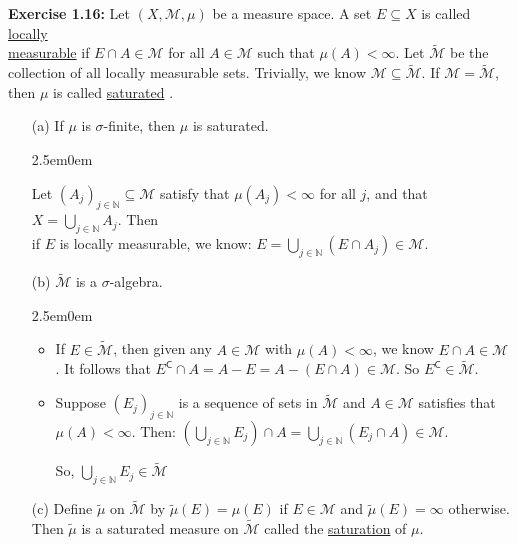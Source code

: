 \documentclass{book}
\newcommand{\exTwoP}{%
   \color{RedViolet}%
   \fontsize{13}{15}\selectfont%
}
\newenvironment{myIndent}{%
   \begin{adjustwidth}{2.5em}{0em}%
}{%
   \end{adjustwidth}%
}
\newcommand{\udefine}[1]{{%
   \setulcolor{Red}%
   \setul{0.14em}{0.07em}%
   \ul{#1}%
}}
\newcommand{\blab}[1]{\textbf{#1}}
\newcommand{\comp}{\mathsf{C}}
\newcommand{\retTwo}{\hfill\bigbreak}
\begin{document}
\blab{Exercise 1.16:} Let $(X, \mathcal{M}, \mu)$ be a measure space. A set $E \subseteq X$ is called \udefine{locally\\ measurable} if $E \cap A \in \mathcal{M}$ for all $A \in \mathcal{M}$ such that $\mu(A) < \infty$. Let $\widetilde{\mathcal{M}}$ be the\\ collection of all locally measurable sets. Trivially, we know $\mathcal{M} \subseteq \widetilde{\mathcal{M}}$. If $\mathcal{M} = \widetilde{\mathcal{M}}$,\\ then $\mu$ is called \udefine{saturated}.

\begin{enumerate}
   \item[(a)] If $\mu$ is $\sigma$-finite, then $\mu$ is saturated.
   
   \begin{myIndent}\exTwoP
      Let $(A_j)_{j \in \mathbb{N}} \subseteq \mathcal{M}$ satisfy that $\mu(A_j) < \infty$ for all $j$, and that $X = \bigcup\limits_{j\in\mathbb{N}}A_j$. Then\\ [-8pt] if $E$ is locally measurable, we know: $E = \bigcup\limits_{j \in \mathbb{N}}(E \cap A_j) \in \mathcal{M}$. 
   \end{myIndent}

   \item[(b)] $\widetilde{\mathcal{M}}$ is a $\sigma$-algebra.
   \begin{myIndent}\exTwoP
      \begin{itemize}
         \item If $E \in \widetilde{\mathcal{M}}$, then given any $A \in \mathcal{M}$ with $\mu(A) < \infty$, we know $E \cap A \in \mathcal{M}$. It follows that $E^\comp \cap A = A - E = A - (E \cap A) \in \mathcal{M}$. So $E^\comp \in \widetilde{\mathcal{M}}$.\\ [-8pt]
         \item Suppose $(E_j)_{j \in \mathbb{N}}$ is a sequence of sets in $\widetilde{\mathcal{M}}$ and $A \in \mathcal{M}$ satisfies that\\ $\mu(A) < \infty$. Then: $(\bigcup\limits_{j \in \mathbb{N}}E_j) \cap A = \bigcup\limits_{j \in \mathbb{N}}(E_j \cap A) \in \mathcal{M}$.\retTwo

         So, $\bigcup\limits_{j \in \mathbb{N}}E_j \in \widetilde{\mathcal{M}}$
      \end{itemize}
   \end{myIndent}

   \item[(c)] Define $\widetilde{\mu}$ on $\widetilde{\mathcal{M}}$ by $\widetilde{\mu}(E) = \mu(E)$ if $E \in \mathcal{M}$ and $\widetilde{\mu}(E) = \infty$ otherwise. Then $\widetilde{\mu}$ is a saturated measure on $\widetilde{\mathcal{M}}$ called the \udefine{saturation} of $\mu$.
   

\end{enumerate}
\end{document}
